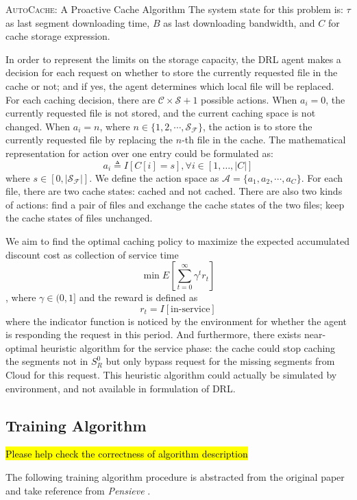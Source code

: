 \documentclass{article}
\begin{document}
\begin{section}{\textsc{AutoCache}: A Proactive Cache Algorithm}
    The system state for this problem is: $\tau$ as last segment downloading time, $B$ as last downloading bandwidth, and $C$ for cache storage expression.

    In order to represent the limits on the storage capacity, the DRL agent makes a decision for each request on whether to store the currently requested file in the cache or not; and if yes, the agent determines which local file will be replaced. For each caching decision, there are $\mathcal{C} \times \mathcal{S} + 1$ possible actions. When $a_i=0$, the currently requested file is not stored, and the current caching space is not changed. When $a_i = n$, where $n\in\{1,2,\cdots,\mathcal{S_F}\}$, the action is to store the currently requested file by replacing the $n$-th file in the cache. The mathematical representation for action over one entry could be formulated as:
    $$
    a_i \triangleq I[C[i]=s], \forall i \in [1, \dots, |C|]
    $$
    where $s \in [0, |\mathcal{S_F}|]$. We define the action space as $\mathcal{A}=\{a_1, a_2, \cdots, a_C\}$. For each file, there are two cache states: cached and not cached. There are also two kinds of actions: find a pair of files and exchange the cache states of the two files; keep the cache states of files unchanged.
    
    We aim to find the optimal caching policy to maximize the expected accumulated discount cost as collection of service time
    $$
    \min E[\sum_{t=0}^{\infty} \gamma^t r_t]
    $$
    , where $\gamma\in(0,1]$ and the reward is defined as
    $$
    r_t = I[\text{in-service}]
    $$
    where the indicator function is noticed by the environment for whether the agent is responding the request in this period. And furthermore, there exists near-optimal heuristic algorithm for the service phase: the cache could stop caching the segments not in $S^{0}_{R}$ but only bypass request for the missing segments from Cloud for this request. This heuristic algorithm could actually be simulated by environment, and not available in formulation of DRL.

    \subsection{Training Algorithm}
    \begin{center}
        \hl{Please help check the correctness of algorithm description}
    \end{center}
    The following training algorithm procedure is abstracted from the original paper \cite{a3c} and take reference from \textit{Pensieve} \cite{Pensieve}.


\end{section}
\end{document}
